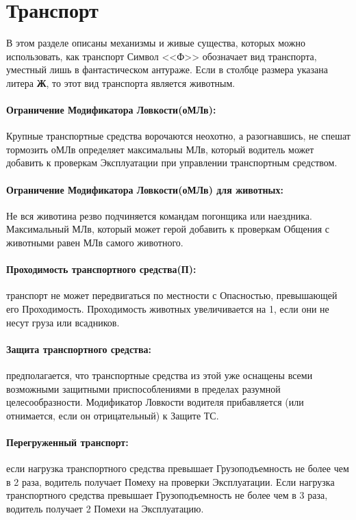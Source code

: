 \section{Транспорт}
В этом разделе описаны механизмы и живые существа, которых можно использовать, как транспорт
\newline Символ <<Ф>> обозначает вид транспорта, уместный лишь в фантастическом антураже.
\newline Если в столбце размера указана литера \textbf{Ж}, то этот вид транспорта является животным.
\paragraph{Ограничение Модификатора Ловкости(оМЛв):} Крупные транспортные средства ворочаются неохотно, а разогнавшись, не спешат тормозить оМЛв определяет максимальны МЛв, который водитель может добавить к проверкам Эксплуатации при управлении транспортным средством.
\paragraph{Ограничение Модификатора Ловкости(оМЛв) для животных:} Не вся животина резво подчиняется командам погонщика или наездника. Максимальный МЛв, который может герой добавить к проверкам Общения с животными равен МЛв самого животного.
\paragraph{Проходимость транспортного средства(П):} транспорт не может передвигаться по местности с Опасностью, превышающей его Проходимость. Проходимость животных увеличивается на 1, если они не несут груза или всадников.
\paragraph{Защита транспортного средства:} предполагается, что транспортные средства из этой уже оснащены всеми возможными защитными приспособлениями в пределах разумной целесообразности. Модификатор Ловкости водителя прибавляется (или отнимается, если он отрицательный) к Защите ТС.
\paragraph{Перегруженный транспорт:} если нагрузка транспортного средства превышает Грузоподъемность не более чем в 2 раза, водитель получает Помеху на проверки Эксплуатации. Если нагрузка транспортного средства превышает Грузоподъемность не более чем в 3 раза, водитель получает 2 Помехи на Эксплуатацию.
